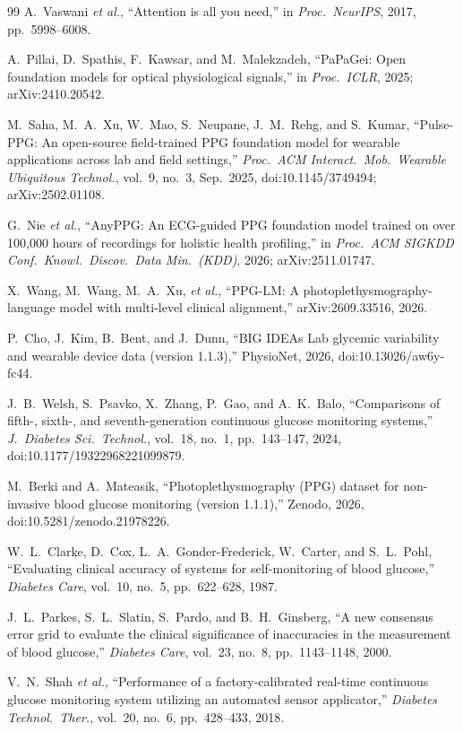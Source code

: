 \documentclass[journal]{IEEEtran}
\begin{document}
\begin{thebibliography}{99}
A.~Vaswani \emph{et al.}, ``Attention is all you need,'' in \emph{Proc.\
NeurIPS}, 2017, pp.~5998--6008.

A.~Pillai, D.~Spathis, F.~Kawsar, and M.~Malekzadeh, ``PaPaGei: Open foundation models for optical
physiological signals,'' in \emph{Proc.\ ICLR}, 2025; arXiv:2410.20542.

M.~Saha, M.~A.~Xu, W.~Mao, S.~Neupane, J.~M.~Rehg, and S.~Kumar,
``Pulse-PPG: An open-source field-trained PPG foundation model for wearable
applications across lab and field settings,'' \emph{Proc.\ ACM Interact.\
Mob.\ Wearable Ubiquitous Technol.}, vol.~9, no.~3, Sep.\ 2025,
doi:10.1145/3749494; arXiv:2502.01108.

G.~Nie \emph{et al.}, ``AnyPPG: An ECG-guided PPG foundation model
trained on over 100,000 hours of recordings for holistic health profiling,''
in \emph{Proc.\ ACM SIGKDD Conf.\ Knowl.\ Discov.\ Data Min.\ (KDD)}, 2026;
arXiv:2511.01747.

X.~Wang, M.~Wang, M.~A.~Xu, \emph{et al.}, ``PPG-LM: A photoplethysmography-language
model with multi-level clinical alignment,'' arXiv:2609.33516, 2026.

\bibitem{cho2026bigideas}
P.~Cho, J.~Kim, B.~Bent, and J.~Dunn, ``BIG IDEAs Lab glycemic variability
and wearable device data (version 1.1.3),'' PhysioNet, 2026,
doi:10.13026/aw6y-fc44.

J.~B.~Welsh, S.~Psavko, X.~Zhang, P.~Gao, and A.~K.~Balo, ``Comparisons of
fifth-, sixth-, and seventh-generation continuous glucose monitoring
systems,'' \emph{J.\ Diabetes Sci.\ Technol.}, vol.~18, no.~1, pp.~143--147,
2024, doi:10.1177/19322968221099879.

M.~Berki and A.~Mateasik, ``Photoplethysmography (PPG) dataset for
non-invasive blood glucose monitoring (version 1.1.1),'' Zenodo, 2026,
doi:10.5281/zenodo.21978226.

W.~L.~Clarke, D.~Cox, L.~A.~Gonder-Frederick, W.~Carter, and S.~L.~Pohl,
``Evaluating clinical accuracy of systems for self-monitoring of blood
glucose,'' \emph{Diabetes Care}, vol.~10, no.~5, pp.~622--628, 1987.

\bibitem{parkes2000}
J.~L.~Parkes, S.~L.~Slatin, S.~Pardo, and B.~H.~Ginsberg, ``A new consensus
error grid to evaluate the clinical significance of inaccuracies in the
measurement of blood glucose,'' \emph{Diabetes Care}, vol.~23, no.~8,
pp.~1143--1148, 2000.

V.~N.~Shah \emph{et al.}, ``Performance of a factory-calibrated real-time
continuous glucose monitoring system utilizing an automated sensor applicator,''
\emph{Diabetes Technol.\ Ther.}, vol.~20, no.~6, pp.~428--433, 2018.

\end{thebibliography}
\end{document}
